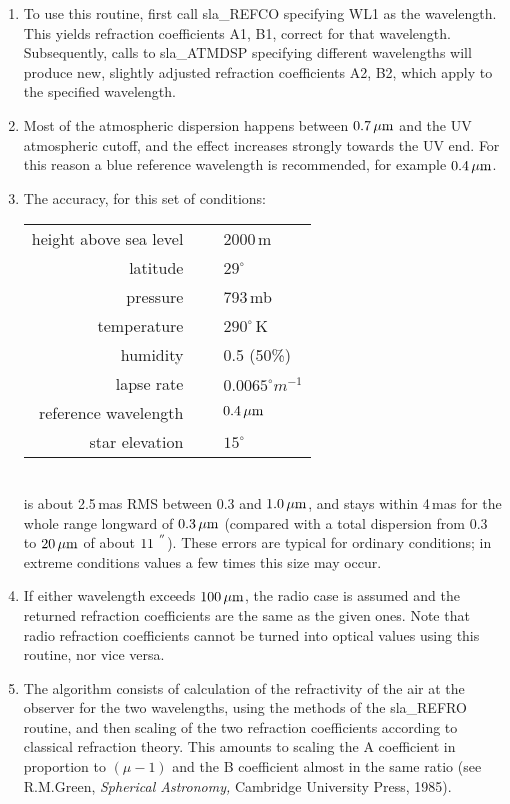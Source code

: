\documentclass[11pt,twoside,nolof]{starlink}
\providecommand{\arcseci}[1] {$#1\hspace{-0.05em}$\raisebox{-0.5ex}
                         {$^{'\hspace{-0.1em}'}$}}
\begin{document}
{
 \begin{enumerate}
  \item To use this routine, first call sla\_REFCO specifying WL1 as the
        wavelength.  This yields refraction coefficients A1, B1, correct
        for that wavelength.  Subsequently, calls to sla\_ATMDSP specifying
        different wavelengths will produce new, slightly adjusted
        refraction coefficients A2, B2, which apply to the specified wavelength.
  \item Most of the atmospheric dispersion happens between $0.7\,\mu{\rm m}$
        and the UV atmospheric cutoff, and the effect increases strongly
        towards the UV end.  For this reason a blue reference wavelength
        is recommended, for example $0.4\,\mu{\rm m}$.
  \item The accuracy, for this set of conditions: \\[1pc]
   \hspace*{5ex} \begin{tabular}{rcl}
        height above sea level & ~ & 2000\,m \\
                      latitude & ~ & $29^\circ$ \\
                      pressure & ~ & 793\,mb \\
                   temperature & ~ & $290^\circ$\,K \\
                      humidity & ~ & 0.5 (50\%) \\
                    lapse rate & ~ & $0.0065^\circ m^{-1}$ \\
          reference wavelength & ~ & $0.4\,\mu{\rm m}$ \\
                star elevation & ~ & $15^\circ$ \\
                  \end{tabular}\\[1pc]
        is about 2.5\,mas RMS between 0.3 and $1.0\,\mu{\rm m}$, and stays
        within 4\,mas for the whole range longward of $0.3\,\mu{\rm m}$
        (compared with a total dispersion from 0.3 to $20\,\mu{\rm m}$
        of about \arcseci{11}).  These errors are typical for ordinary
        conditions;  in extreme conditions values a few times this size
        may occur.
  \item If either wavelength exceeds $100\,\mu{\rm m}$, the radio case
        is assumed and the returned refraction coefficients are the
        same as the given ones. Note that radio refraction coefficients
        cannot be turned into optical values using this routine, nor
        vice versa.
  \item The algorithm consists of calculation of the refractivity of the
        air at the observer for the two wavelengths, using the methods
        of the sla\_REFRO routine, and then scaling of the two refraction
        coefficients according to classical refraction theory.  This
        amounts to scaling the A coefficient in proportion to $(\mu-1)$ and
        the B coefficient almost in the same ratio (see R.M.Green,
        \textit{Spherical Astronomy,}\/ Cambridge University Press, 1985).
 \end{enumerate}
}
\end{document}
